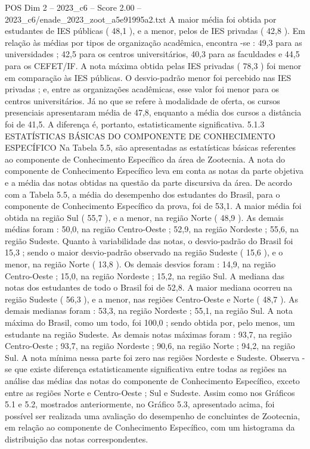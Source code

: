 \begin{textsample}{POS Dim 2 – 2023\_c6 – Score 2.00 – 2023\_c6/enade\_2023\_zoot\_a5e91995a2.txt}
A maior média foi obtida por estudantes de IES públicas ( 48,1 ), e a menor, pelos de IES privadas ( 42,8 ).
Em relação às médias por tipos de organização acadêmica, encontra -se : 49,3 para as universidades ; 42,5 para os centros universitários, 40,3 para as faculdades e 44,5 para os CEFET/IF.
A nota máxima obtida pelas IES privadas ( 78,3 ) foi menor em comparação às IES públicas.
O desvio-padrão menor foi percebido nas IES privadas ; e, entre as organizações acadêmicas, esse valor foi menor para os centros universitários.
Já no que se refere à modalidade de oferta, os cursos presenciais apresentaram média de 47,8, enquanto a média dos cursos a distância foi de 41,5.
A diferença é, portanto, estatisticamente significativa. 5.1.3 ESTATÍSTICAS BÁSICAS DO COMPONENTE DE CONHECIMENTO ESPECÍFICO Na Tabela 5.5, são apresentadas as estatísticas básicas referentes ao componente de Conhecimento Específico da área de Zootecnia.
A nota do componente de Conhecimento Específico leva em conta as notas da parte objetiva e a média das notas obtidas na questão da parte discursiva da área.
De acordo com a Tabela 5.5, a média do desempenho dos estudantes do Brasil, para o componente de Conhecimento Específico da prova, foi de 53,1.
A maior média foi obtida na região Sul ( 55,7 ), e a menor, na região Norte ( 48,9 ).
As demais médias foram : 50,0, na região Centro-Oeste ; 52,9, na região Nordeste ; 55,6, na região Sudeste.
Quanto à variabilidade das notas, o desvio-padrão do Brasil foi 15,3 ; sendo o maior desvio-padrão observado na região Sudeste ( 15,6 ), e o menor, na região Norte ( 13,8 ).
Os demais desvios foram : 14,9, na região Centro-Oeste ; 15,0, na região Nordeste ; 15,2, na região Sul.
A mediana das notas dos estudantes de todo o Brasil foi de 52,8.
A maior mediana ocorreu na região Sudeste ( 56,3 ), e a menor, nas regiões Centro-Oeste e Norte ( 48,7 ).
As demais medianas foram : 53,3, na região Nordeste ; 55,1, na região Sul.
A nota máxima do Brasil, como um todo, foi 100,0 ; sendo obtida por, pelo menos, um estudante na região Sudeste.
As demais notas máximas foram : 93,7, na região Centro-Oeste ; 93,7, na região Nordeste ; 90,6, na região Norte ; 94,2, na região Sul.
A nota mínima nessa parte foi zero nas regiões Nordeste e Sudeste.
Observa -se que existe diferença estatisticamente significativa entre todas as regiões na análise das médias das notas do componente de Conhecimento Específico, exceto entre as regiões Norte e Centro-Oeste ; Sul e Sudeste.
Assim como nos Gráficos 5.1 e 5.2, mostrados anteriormente, no Gráfico 5.3, apresentado acima, foi possível ser realizada uma avaliação do desempenho de concluintes de Zootecnia, em relação ao componente de Conhecimento Específico, com um histograma da distribuição das notas correspondentes.

\end{textsample}
